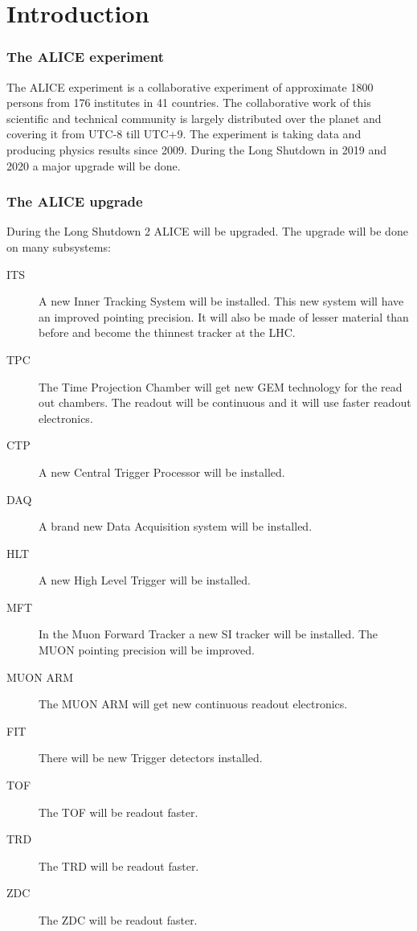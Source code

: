 \chapter{Introduction}

\subsection{The ALICE experiment}
The ALICE experiment is a collaborative experiment of approximate 1800 persons from 176 institutes in 41 countries. The collaborative work of this scientific and technical community is largely distributed over the planet and covering it from UTC-8 till UTC+9. The experiment is taking data and producing physics results since 2009. During the Long Shutdown in 2019 and 2020 a major upgrade will be done. 

\subsection{The ALICE upgrade}
During the Long Shutdown 2 ALICE will be upgraded. The upgrade will be done on many subsystems:
\begin{description}
  \item[ITS] A new Inner Tracking System will be installed. This new system will have an improved pointing precision. It will also be made of lesser material than before and become the thinnest tracker at the LHC.
  \item[TPC] The Time Projection Chamber will get new GEM technology for the read out chambers. The readout will be continuous and it will use faster readout electronics.
  \item[CTP] A new Central Trigger Processor will be installed.
  \item[DAQ] A brand new Data Acquisition system will be installed.
  \item[HLT] A new High Level Trigger will be installed.
  \item[MFT] In the Muon Forward Tracker a new SI tracker will be installed. The MUON pointing precision will be improved.
  \item[MUON ARM] The MUON ARM will get new continuous readout electronics.
  \item[FIT] There will be new Trigger detectors installed.
  \item[TOF] The TOF will be readout faster.
  \item[TRD] The TRD will be readout faster.
  \item[ZDC] The ZDC will be readout faster.
\end{description}
